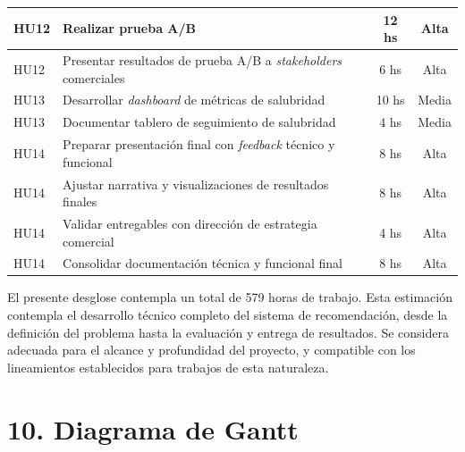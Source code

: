 \documentclass[
11pt, %
]{charter}
\begin{document}
\begin{longtable}{|p{2cm}|p{10cm}|c|c|}
HU12 & Realizar prueba A/B & 12 hs & Alta \\ \hline
HU12 & Presentar resultados de prueba A/B a \textit{stakeholders} comerciales & 6 hs & Alta \\ \hline

HU13 & Desarrollar \textit{dashboard} de métricas de salubridad & 10 hs & Media \\ \hline
HU13 & Documentar tablero de seguimiento de salubridad & 4 hs & Media \\ \hline

HU14 & Preparar presentación final con \textit{feedback} técnico y funcional & 8 hs & Alta \\ \hline
HU14 & Ajustar narrativa y visualizaciones de resultados finales & 8 hs & Alta \\ \hline
HU14 & Validar entregables con dirección de estrategia comercial & 4 hs & Alta \\ \hline
HU14 & Consolidar documentación técnica y funcional final & 8 hs & Alta \\ \hline

\end{longtable}

El presente desglose contempla un total de 579 horas de trabajo. Esta estimación contempla el desarrollo técnico completo del sistema de recomendación, desde la definición del problema hasta la evaluación y entrega de resultados. Se considera adecuada para el alcance y profundidad del proyecto, y compatible con los lineamientos establecidos para trabajos de esta naturaleza.

\section{10. Diagrama de Gantt}
\label{sec:gantt}
\end{document}
